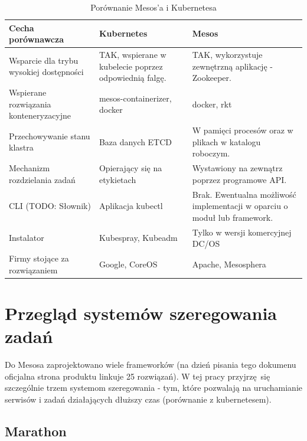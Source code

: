\documentclass[10pt,a4paper,titlepage,twoside]{report}
\begin{document}
\begin{table}[!htbp]
\caption{Porównanie Mesos'a i Kubernetesa}
\label{k8s_mesos_comparision}
\centering
\begin{tabular}{|p{4cm}|p{6cm}|p{6cm}|}
  \hline
  \textbf{Cecha porównawcza} & \textbf{Kubernetes} & \textbf{Mesos}\\
  \hline
  Wsparcie dla trybu wysokiej dostępności & TAK, wspierane w kubelecie poprzez odpowiednią falgę. & TAK, wykorzystuje zewnętrzną aplikację - Zookeeper. \\
  \hline
  Wspierane rozwiązania konteneryzacyjne & mesos-containerizer, docker & docker, rkt \\
  \hline
  Przechowywanie stanu klastra & Baza danych ETCD & W pamięci procesów oraz w plikach w katalogu roboczym. \\
  \hline
  Mechanizm rozdzielania zadań & Opierający się na etykietach & Wystawiony na zewnątrz poprzez programowe API. \\
  \hline
  CLI (TODO: Słownik) & Aplikacja kubectl & Brak. Ewentualna możliwość implementacji w oparciu o moduł lub framework. \\
  \hline
  Instalator & Kubespray, Kubeadm & Tylko w wersji komercyjnej DC/OS \\
  \hline
  Firmy stojące za rozwiązaniem & Google, CoreOS & Apache, Mesosphera \\
  \hline
\end{tabular}
\end{table}

\newpage

\section{Przegląd systemów szeregowania zadań}

Do Mesosa zaprojektowano wiele frameworków (na dzień pisania tego dokumenu oficjalna strona produktu linkuje 25 rozwiązań). W tej pracy przyjrzę się szczególnie trzem systemom szeregowania - tym, które pozwalają na uruchamianie serwisów i zadań działających dłuższy czas (porównanie z kubernetesem). 

\subsection{Marathon}
\end{document}
